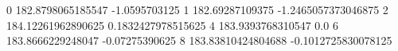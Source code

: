 0 182.8798065185547 -1.0595703125
1 182.69287109375 -1.2465057373046875
2 184.12261962890625 0.1832427978515625
4 183.9393768310547 0.0
6 183.8666229248047 -0.07275390625
8 183.83810424804688 -0.1012725830078125
